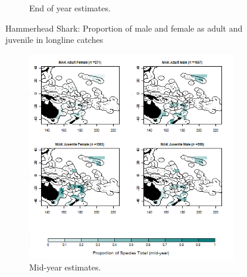 \documentclass[12pt]{SCreport}
\begin{document}
\begin{landscape}
\begin{figure}
\begin{subfigure}[b]{0.6\textwidth}
       \caption{End of year estimates.}
       \label{fig:test2}
   \end{subfigure}
\caption{Hammerhead Shark: Proportion of male and female as adult and juvenile in longline catches }
\label{fig:test} 
\end{figure}
\end{landscape}

\begin{landscape}
\begin{figure}
\centering
   \begin{subfigure}[b]{0.6\textwidth}
       \includegraphics[width=\textwidth]{../GRAPHICS/Defined/BI_26_Map_maturity_sex_MAK_MY}
       \caption{Mid-year estimates.}
       \label{fig:test1}
   \end{subfigure}
   \begin{subfigure}[b]{0.6\textwidth}

\end{subfigure}
\end{figure}
\end{landscape}
\end{document}
